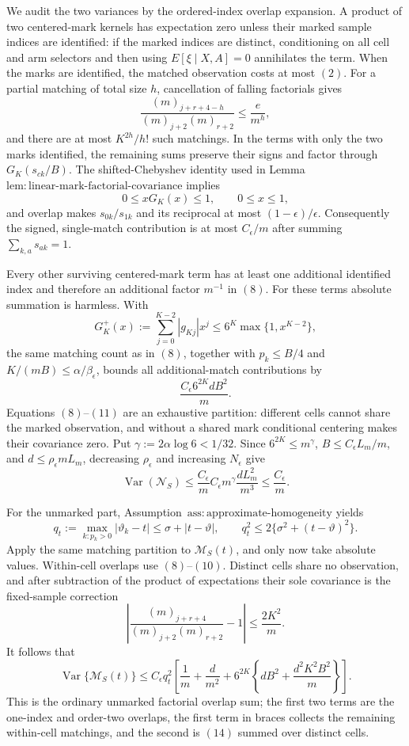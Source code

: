 We audit the two variances by the ordered-index overlap expansion.  A product of two centered-mark kernels has expectation zero unless their marked sample indices are identified: if the marked indices are distinct, conditioning on all cell and arm selectors and then using \(E[\xi\mid X,A]=0\) annihilates the term.  When the marks are identified, the matched observation costs at most \((2)\).  For a partial matching of total size \(h\), cancellation of falling factorials gives
\[
 \frac{(m)_{j+r+4-h}}{(m)_{j+2}(m)_{r+2}}
 \le \frac e{m^h},
\tag{8}
\]
and there are at most \(K^{2h}/h!\) such matchings.  In the terms with only the two marks identified, the remaining sums preserve their signs and factor through \(G_K(s_{ck}/B)\).  The shifted-Chebyshev identity used in Lemma~\(\mathrm{lem:linear\text{-}mark\text{-}factorial\text{-}covariance}\) implies
\[
 0\le xG_K(x)\le1,
 \qquad 0\le x\le1,
\tag{9}
\]
and overlap makes \(s_{0k}/s_{1k}\) and its reciprocal at most \((1-\epsilon)/\epsilon\).  Consequently the signed, single-match contribution is at most \(C_{\epsilon}/m\) after summing \(\sum_{k,a}s_{ak}=1\).

Every other surviving centered-mark term has at least one additional identified index and therefore an additional factor \(m^{-1}\) in \((8)\).  For these terms absolute summation is harmless.  With
\[
 G_K^+(x):=\sum_{j=0}^{K-2}|g_{Kj}|x^j
 \le6^K\max\{1,x^{K-2}\},
\tag{10}
\]
the same matching count as in \((8)\), together with \(p_k\le B/4\) and \(K/(mB)\le\alpha/\beta_{\epsilon}\), bounds all additional-match contributions by
\[
 \frac{C_{\epsilon}6^{2K}dB^2}{m}.
\tag{11}
\]
Equations \((8)\)--\((11)\) are an exhaustive partition: different cells cannot share the marked observation, and without a shared mark conditional centering makes their covariance zero.  Put \(\gamma:=2\alpha\log6<1/32\).  Since \(6^{2K}\le m^{\gamma}\), \(B\le C_{\epsilon}L_m/m\), and \(d\le\rho_{\epsilon}mL_m\), decreasing \(\rho_{\epsilon}\) and increasing \(N_{\epsilon}\) give
\[
 \operatorname{Var}(\mathcal N_S)
 \le \frac{C_{\epsilon}}m
 C_{\epsilon}m^{\gamma}\frac{dL_m^2}{m^3}
 \le \frac{C_{\epsilon}}m.
\tag{12}
\]

For the unmarked part, Assumption~\(\mathrm{ass:approximate\text{-}homogeneity}\) yields
\[
 q_t:=\max_{k:p_k>0}|\vartheta_k-t|
 \le\sigma+|t-\vartheta|,
 \qquad q_t^2\le2\{\sigma^2+(t-\vartheta)^2\}.
\tag{13}
\]
Apply the same matching partition to \(\mathcal M_S(t)\), and only now take absolute values.  Within-cell overlaps use \((8)\)--\((10)\).  Distinct cells share no observation, and after subtraction of the product of expectations their sole covariance is the fixed-sample correction
\[
 \left|\frac{(m)_{j+r+4}}{(m)_{j+2}(m)_{r+2}}-1\right|
 \le\frac{2K^2}{m}.
\tag{14}
\]
It follows that
\[
 \operatorname{Var}\{\mathcal M_S(t)\}
 \le C_{\epsilon}q_t^2\left[
 \frac1m+\frac d{m^2}
 +6^{2K}\left\{dB^2+\frac{d^2K^2B^2}{m}\right\}
 \right].
\tag{15}
\]
This is the ordinary unmarked factorial overlap sum; the first two terms are the one-index and order-two overlaps, the first term in braces collects the remaining within-cell matchings, and the second is \((14)\) summed over distinct cells.


